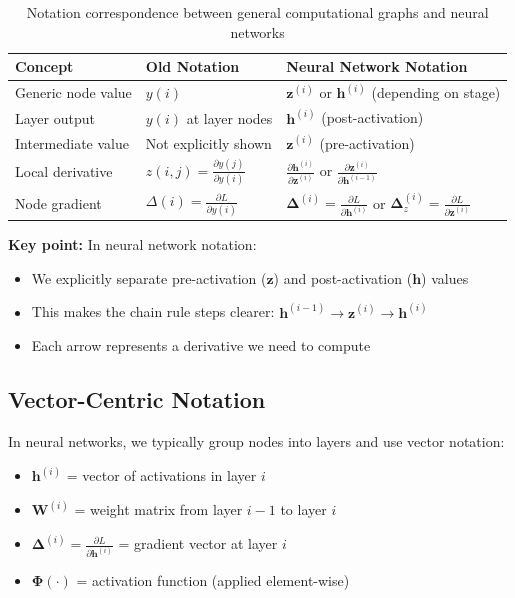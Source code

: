 \begin{notechapter}
\begin{table}[h]
\centering
\begin{tabular}{|l|l|l|}
\hline
\textbf{Concept} & \textbf{Old Notation} & \textbf{Neural Network Notation} \\
\hline
\hline
Generic node value & $y(i)$ & $\mathbf{z}^{(i)}$ or $\mathbf{h}^{(i)}$ (depending on stage) \\
\hline
Layer output & $y(i)$ at layer nodes & $\mathbf{h}^{(i)}$ (post-activation) \\
\hline
Intermediate value & Not explicitly shown & $\mathbf{z}^{(i)}$ (pre-activation) \\
\hline
Local derivative & $z(i,j) = \frac{\partial y(j)}{\partial y(i)}$ & $\frac{\partial \mathbf{h}^{(i)}}{\partial \mathbf{z}^{(i)}}$ or $\frac{\partial \mathbf{z}^{(i)}}{\partial \mathbf{h}^{(i-1)}}$ \\
\hline
Node gradient & $\Delta(i) = \frac{\partial L}{\partial y(i)}$ & $\boldsymbol{\Delta}^{(i)} = \frac{\partial L}{\partial \mathbf{h}^{(i)}}$ or $\boldsymbol{\Delta}_z^{(i)} = \frac{\partial L}{\partial \mathbf{z}^{(i)}}$ \\
\hline
\end{tabular}
\caption{Notation correspondence between general computational graphs and neural networks}
\end{table}

\textbf{Key point:} In neural network notation:
\begin{itemize}
    \item We explicitly separate pre-activation ($\mathbf{z}$) and post-activation ($\mathbf{h}$) values
    \item This makes the chain rule steps clearer: $\mathbf{h}^{(i-1)} \to \mathbf{z}^{(i)} \to \mathbf{h}^{(i)}$
    \item Each arrow represents a derivative we need to compute
\end{itemize}

\subsection{Vector-Centric Notation}

In neural networks, we typically group nodes into layers and use vector notation:

\begin{tcolorbox}[colback=examplecolor,colframe=nodecolor,title=Vector Notation]
\begin{itemize}
    \item $\mathbf{h}^{(i)}$ = vector of activations in layer $i$
    \item $\mathbf{W}^{(i)}$ = weight matrix from layer $i-1$ to layer $i$
    \item $\boldsymbol{\Delta}^{(i)} = \frac{\partial L}{\partial \mathbf{h}^{(i)}}$ = gradient vector at layer $i$
    \item $\boldsymbol{\Phi}(\cdot)$ = activation function (applied element-wise)
\end{itemize}
\end{tcolorbox}


\end{notechapter}
